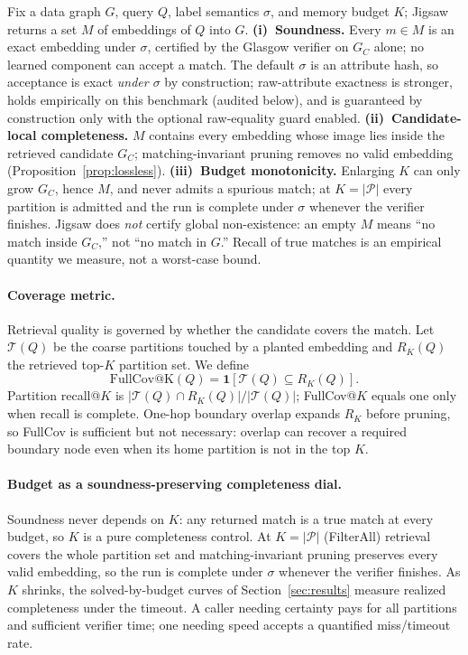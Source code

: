 \documentclass[sigconf, nonacm]{acmart}
\begin{document}
\begin{guaranteebox}
Fix a data graph $G$, query $Q$, label semantics $\sigma$, and memory budget $K$; Jigsaw returns a set $M$ of embeddings of $Q$ into $G$.
\textbf{(i)~Soundness.} Every $m\in M$ is an exact embedding under $\sigma$, certified by the Glasgow verifier on $G_C$ alone; no learned component can accept a match. The default $\sigma$ is an attribute hash, so acceptance is exact \emph{under $\sigma$} by construction; raw-attribute exactness is stronger, holds empirically on this benchmark (audited below), and is guaranteed by construction only with the optional raw-equality guard enabled.
\textbf{(ii)~Candidate-local completeness.} $M$ contains every embedding whose image lies inside the retrieved candidate $G_C$; matching-invariant pruning removes no valid embedding (Proposition~\ref{prop:lossless}).
\textbf{(iii)~Budget monotonicity.} Enlarging $K$ can only grow $G_C$, hence $M$, and never admits a spurious match; at $K=|\mathcal{P}|$ every partition is admitted and the run is complete under $\sigma$ whenever the verifier finishes.
Jigsaw does \emph{not} certify global non-existence: an empty $M$ means ``no match inside $G_C$,'' not ``no match in $G$.'' Recall of true matches is an empirical quantity we measure, not a worst-case bound.
\end{guaranteebox}

\paragraph{Coverage metric.}
Retrieval quality is governed by whether the candidate covers the match. Let $\mathcal{T}(Q)$ be the coarse partitions touched by a planted embedding and $R_K(Q)$ the retrieved top-$K$ partition set. We define
\begin{equation}
\mathrm{FullCov@K}(Q)=\mathbf{1}\left[\mathcal{T}(Q)\subseteq R_K(Q)\right].
\end{equation}
Partition recall@$K$ is $|\mathcal{T}(Q)\cap R_K(Q)|/|\mathcal{T}(Q)|$; FullCov@$K$ equals one only when recall is complete. One-hop boundary overlap expands $R_K$ before pruning, so FullCov is sufficient but not necessary: overlap can recover a required boundary node even when its home partition is not in the top $K$.

\paragraph{Budget as a soundness-preserving completeness dial.}
Soundness never depends on $K$: any returned match is a true match at every budget, so $K$ is a pure completeness control. At $K=|\mathcal{P}|$ (FilterAll) retrieval covers the whole partition set and matching-invariant pruning preserves every valid embedding, so the run is complete under $\sigma$ whenever the verifier finishes. As $K$ shrinks, the solved-by-budget curves of Section~\ref{sec:results} measure realized completeness under the timeout. A caller needing certainty pays for all partitions and sufficient verifier time; one needing speed accepts a quantified miss/timeout rate.
\end{document}
